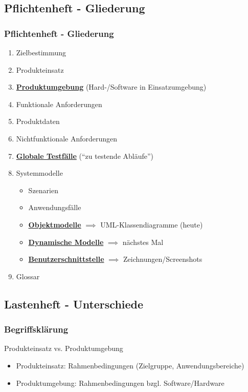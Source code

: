 \documentclass[18pt]{beamer}
\begin{document}
	\subsection{Pflichtenheft - Gliederung}
	\begin{frame}
		\frametitle{Pflichtenheft - Gliederung}
		\pause
		\begin{enumerate}
			\item Zielbestimmung  
			\item Produkteinsatz 
			\item \underline{\textbf{Produktumgebung}} (Hard-/Software in Einsatzumgebung)
			\item Funktionale Anforderungen 
			\item Produktdaten 
			\item Nichtfunktionale Anforderungen 
			\item \underline{\textbf{Globale Testfälle}} (\enquote{zu testende Abläufe})
			\item Systemmodelle
			\begin{itemize}
				\item Szenarien
				\item Anwendungsfälle
				\item \underline{\textbf{Objektmodelle}} $\implies$ UML-Klassendiagramme (heute)
				\item \underline{\textbf{Dynamische Modelle}} $\implies$ nächstes Mal
				\item \underline{\textbf{Benutzerschnittstelle}} $\implies$ Zeichnungen/Screenshots
			\end{itemize}
			\item Glossar 
		\end{enumerate}
	\end{frame}
	
	\subsection{Lastenheft - Unterschiede}
	\begin{frame}
		\frametitle{Begriffsklärung}
		\begin{block}{Produkteinsatz vs. Produktumgebung}
			\pause
			\begin{itemize}
				\item Produkteinsatz: Rahmenbedingungen (Zielgruppe, Anwendungsbereiche)
				\item Produktumgebung: Rahmenbedingungen bzgl. Software/Hardware
			\end{itemize}
		\end{block}
	\end{frame}
	
\end{document}
